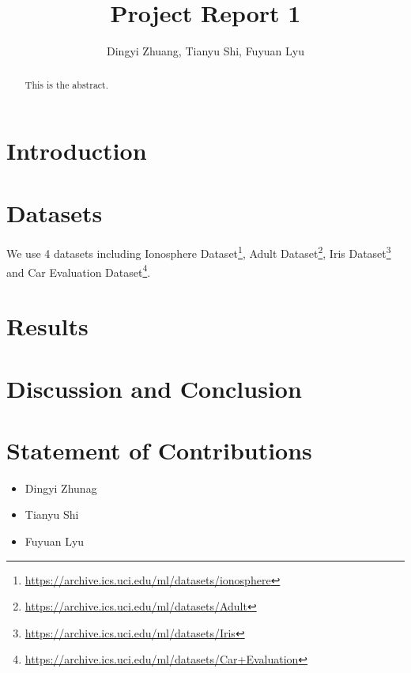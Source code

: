 \documentclass[]{scrartcl}
\title{Project Report 1}
\author{Dingyi Zhuang, Tianyu Shi, Fuyuan Lyu}
\begin{document}
\maketitle

\begin{abstract}
This is the abstract.
\end{abstract}

\section{Introduction}

\section{Datasets}
We use 4 datasets including Ionosphere Dataset\footnote{\url{https://archive.ics.uci.edu/ml/datasets/ionosphere}}, Adult Dataset\footnote{\url{https://archive.ics.uci.edu/ml/datasets/Adult}}, Iris Dataset\footnote{\url{https://archive.ics.uci.edu/ml/datasets/Iris}} and Car Evaluation Dataset\footnote{\url{https://archive.ics.uci.edu/ml/datasets/Car+Evaluation}}.
\section{Results}

\section{Discussion and Conclusion}

\section{Statement of Contributions}

\begin{itemize}
	\item Dingyi Zhunag
	\item Tianyu Shi
	\item Fuyuan Lyu
\end{itemize}
\end{document}
